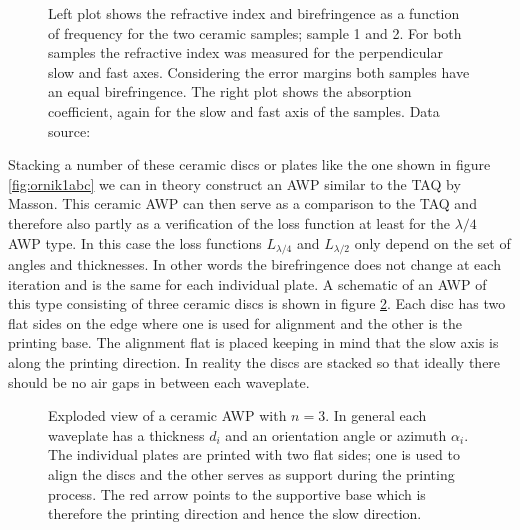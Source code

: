 \begin{figure}[ht]
    \centering
    
    \caption{Left plot shows the refractive index and birefringence as a function of frequency for the two ceramic  samples; sample 1 and 2. For both samples the refractive index was measured for the perpendicular slow and fast axes. Considering the error margins both samples have an equal birefringence. The right plot shows the absorption coefficient, again for the slow and fast axis of the samples. Data source: \cite{Ornik2021}}
    \label{fig:ri_abs}
\end{figure}

Stacking a number of these ceramic discs or plates like the one shown in figure \ref{fig:ornik1abc} we can in theory construct an AWP similar to the TAQ by Masson. This ceramic AWP can then serve as a comparison to the TAQ and therefore also partly as a verification of the loss function at least for the $\lambda/4$ AWP type. In this case the loss functions $L_{\lambda/4}$ and $L_{\lambda/2}$ only depend on the set of angles and thicknesses. In other words the birefringence does not change at each iteration and is the same for each individual plate. A schematic of an AWP of this type consisting of three ceramic discs is shown in figure \ref{fig:ceramic_stack}. Each disc has two flat sides on the edge where one is used for alignment and the other is the printing base. The alignment flat is placed keeping in mind that the slow axis is along the printing direction. In reality the discs are stacked so that ideally there should be no air gaps in between each waveplate.

\begin{figure}[ht]
    \centering
    
    \caption{Exploded view of a ceramic AWP with $n=3$. In general each waveplate has a thickness $d_i$ and an orientation angle or azimuth $\alpha_i$. The individual plates are printed with two flat sides; one is used to align the discs and the other serves as support during the printing process. The red arrow points to the supportive base which is therefore the printing direction and hence the slow direction.}
    \label{fig:ceramic_stack}
\end{figure}

